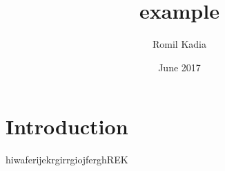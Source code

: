 \documentclass{article}
\title{example}
\author{Romil Kadia}
\date{June 2017}
\begin{document}
\maketitle
\section{Introduction}
hiwaferijekrgirrgiojferghREK
\end{document}
